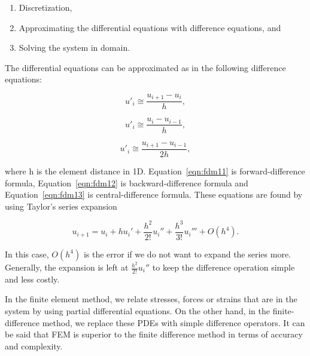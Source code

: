 \begin{enumerate}

\item Discretization,

\item Approximating the differential equations with difference equations, and

\item Solving the system in domain.
\end{enumerate}

\noindent The differential equations can be approximated as in the following difference equations:

\begin{equation}
u'_{i} \cong	\frac{u_{i+1} - u_{i}}{h},
\label{eqn:fdm11}
\end{equation}

\begin{equation}
u'_{i} \cong	\frac{u_{i} - u_{i-1}}{h},
\label{eqn:fdm12}
\end{equation}

\begin{equation}
u'_{i} \cong	\frac{u_{i+1} - u_{i-1}}{2h},
\label{eqn:fdm13}
\end{equation}

\noindent where h is the element distance in 1D. Equation~\ref{eqn:fdm11} is forward-difference formula, Equation~\ref{eqn:fdm12} is backward-difference formula and Equation~\ref{eqn:fdm13} is central-difference formula. These equations are found by using Taylor's series expansion

\begin{equation}
u_{i+1} = u_{i} + hu_{i}' + \frac{h^2}{2!}u_{i}'' + \frac{h^3}{3!}u_{i}''' + O(h^4).
\label{eqn:fdm2}
\end{equation}

In this case, $O(h^4)$ is the error if we do not want to expand the series more. Generally, the expansion is left at $\frac{h^2}{2!}u_{i}''$ to keep the difference operation simple and less costly.

In the finite element method, we relate stresses, forces or strains that are in the system by using partial differential equations. On the other hand, in the finite-difference method, we replace these PDEs with simple difference operators. It can be said that FEM is superior to the finite difference method in terms of accuracy and complexity.



